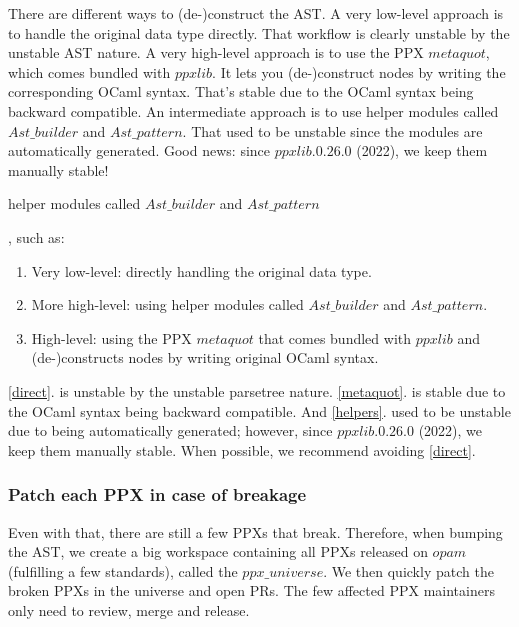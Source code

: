 \documentclass[10pt, a4paper, twocolumn]{article}
\begin{document}
There are different ways to (de-)construct the AST. A very low-level approach is
to handle the original data type directly. That workflow is clearly unstable by
the unstable AST nature. A very high-level approach is to use the PPX
$metaquot$, which comes bundled with $ppxlib$. It lets you (de-)construct nodes
by writing the corresponding OCaml syntax. That's stable due to the OCaml syntax
being backward compatible. An intermediate approach is to use helper modules
called $Ast\_builder$ and $Ast\_pattern$. That used to be unstable since the
modules are automatically generated. Good news: since $ppxlib.0.26.0 $ (2022),
we keep them manually stable!

helper modules called $Ast\_builder$ and $Ast\_pattern$

, such as:
\begin{enumerate}
\item\label{direct}
Very low-level: directly handling the original data type.
\item\label{helpers}
More high-level: using helper modules called $Ast\_builder$ and $Ast\_pattern$.
\item\label{metaquot}
High-level: using the PPX $metaquot$ that comes bundled with $ppxlib$ and
(de-)constructs nodes by writing original OCaml syntax.
\end{enumerate}

\ref{direct}. is unstable by the unstable parsetree nature. \ref{metaquot}. is stable due to
the OCaml syntax being backward compatible. And \ref{helpers}. used to be
unstable due to being automatically generated; however, since $ppxlib.0.26.0 $
(2022), we keep them manually stable. When possible, we recommend
avoiding \ref{direct}.

\subsubsection*{Patch each PPX in case of breakage}

Even with that, there are still a few PPXs that break. Therefore, when bumping
the AST, we create a big workspace containing all PPXs released on $opam$
(fulfilling a few standards), called the $ppx\_universe$\cite{universe}. We then
quickly patch the broken PPXs in the universe and open PRs. The few affected PPX
maintainers only need to review, merge and release.


\nocite{*}


\end{document}
